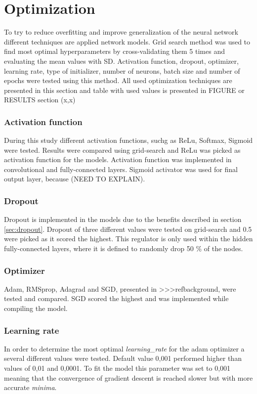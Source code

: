 \section{Optimization}
To try to reduce overfitting and improve generalization of the neural network different techniques are applied network models. Grid search method was used to find most optimal hyperparameters by cross-validating them 5 times and evaluating the mean values with SD. Activation function, dropout, optimizer, learning rate, type of initializer, number of neurons, batch size and number of epochs were tested using this method.  All used optimization techniques are presented in this section and table with used values is presented in FIGURE or RESULTS section (x,x)

\subsubsection{Activation function}
During this study different activation functions, suchg as ReLu, Softmax, Sigmoid were tested. Results were compared using grid-search and ReLu was picked as activation function for the models. Activation function was implemented in convolutional and fully-connected layers. Sigmoid activator was used for final output layer, because (NEED TO EXPLAIN).

\subsubsection{Dropout}
Dropout is implemented in the models due to the benefits described in section \ref{sec:dropout}. Dropout of three different values were tested on grid-search and 0.5 were picked as it scored the highest. This regulator is only used within the hidden fully-connected layers, where it is defined to randomly drop 50 \% of the nodes.

\subsubsection{Optimizer}
Adam, RMSprop, Adagrad and SGD, presented in >>>ref{background}, were tested and compared. SGD scored the highest and was implemented while compiling the model.

\subsubsection{Learning rate}
In order to determine the most optimal \textit{learning\_rate} for the adam optimizer a several different values were tested. Default value 0,001 performed higher than values of 0,01 and 0,0001. To fit the model this parameter was set to 0,001 meaning that the convergence of gradient descent is reached slower but with more accurate \textit{minima}. 

